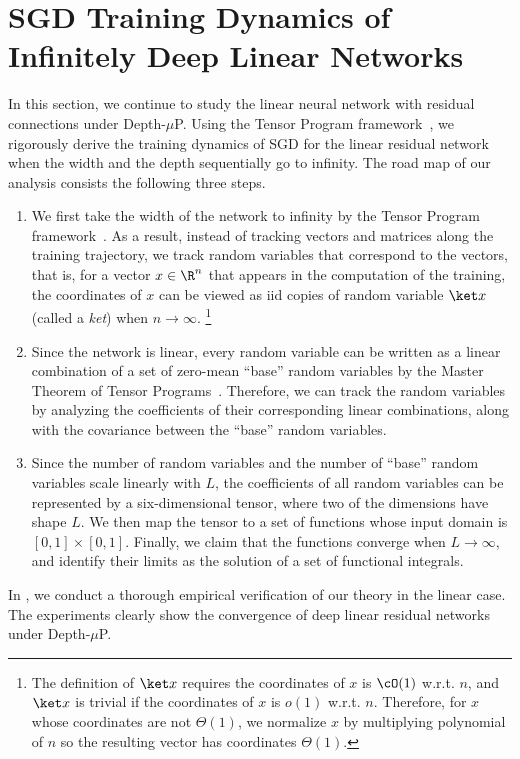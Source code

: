 
\section{SGD Training Dynamics of Infinitely Deep Linear Networks}\label{sec:linearsgd}

In this section, we continue to study the linear neural network with residual connections under Depth-$\mu$P. Using the Tensor Program framework~\citep{yang2023tensor}, we rigorously derive the training dynamics of SGD for the linear residual network when the width and the depth sequentially go to infinity.  The road map of our analysis consists the following three steps.
\begin{enumerate}
    \item We first take the width of the network to infinity by the Tensor Program framework~\cite{yang2023tensor}. As a result, instead of tracking vectors and matrices along the training trajectory, we track random variables that correspond to the vectors, that is, for a vector $x\in \R^n$ that appears in the computation of the training, the coordinates of $x$ can be viewed as iid copies of random variable $\ket x$ (called a \emph{ket}) when $n\to\infty$. \footnote{The definition of $\ket x$ requires the coordinates of $x$ is $\cO(1)$ w.r.t. $n$, and $\ket x$ is trivial if the coordinates of $x$ is $o(1)$ w.r.t. $n$. Therefore, for $x$ whose coordinates are not $\Theta(1)$, we normalize $x$ by multiplying polynomial of $n$ so the resulting vector has coordinates $\Theta(1)$. } 
    \item Since the network is linear, every random variable can be written as a linear combination of a set of zero-mean ``base'' random variables by the Master Theorem of Tensor Programs~\cite{yang2023tensor}. Therefore, we can track the random variables by analyzing the coefficients of their corresponding linear combinations, along with the covariance between the ``base'' random variables.
    \item Since the number of random variables and the number of ``base'' random variables scale linearly with $L$, the coefficients of all random variables can be represented by a six-dimensional tensor, where two of the dimensions have shape $L$. We  then map the tensor to a set of functions whose input domain is $[0,1]\times [0,1]$. Finally, we claim that the functions converge when $L\to\infty$, and identify their limits as the solution of a set of functional integrals.
\end{enumerate}
In , we conduct a thorough empirical verification of our theory in the linear case. The experiments clearly show the convergence of deep linear residual networks under Depth-$\mu$P. 

